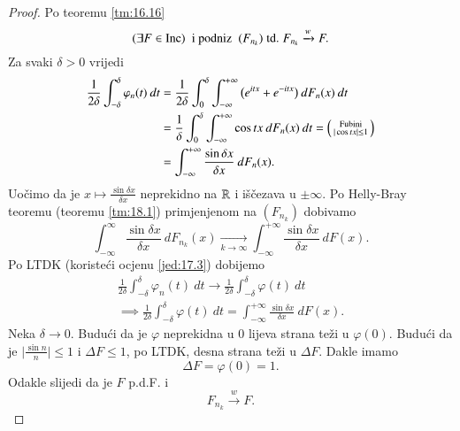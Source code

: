 \begin{proof}
    Po teoremu \ref{tm:16.16}
    \begin{equation*}
        (\exists F \in \mathrm{Inc}) \; \textnormal{ i podniz } \; (F_{n_k}) \; \mathrm{td.} \; F_{n_k} \xrightarrow{w} F.
    \end{equation*}
    Za svaki $\delta > 0$ vrijedi
    \begin{equation*}
        \begin{aligned}
            \frac{1}{2 \delta} \int_{-\delta}^\delta  \varphi_n (t) \: d t &= \frac{1}{2 \delta} \int_0^\delta \int_{-\infty}^{+\infty} \big( e^{itx} + e^{-itx} \big) \: d F_n (x) \: d t\\
            &= \frac{1}{\delta} \int_0^\delta \int_{-\infty}^{+\infty} \cos tx \: d F_n (x) \: dt =
            \begin{psmallmatrix}
                \textnormal{Fubini}\\
                |\cos tx| \leq 1
            \end{psmallmatrix}\\
            &= \int_{-\infty}^{+\infty} \frac{\sin \delta x}{\delta x} \: d F_n (x).
        \end{aligned}
    \end{equation*}
    Uo\v cimo da je $x \mapsto \frac{\sin \delta x}{\delta x}$ neprekidno na $\mathbb{R}$ i i\v s\v cezava u $\pm \infty$.
    Po Helly-Bray teoremu (teoremu \ref{tm:18.1}) primjenjenom na $(F_{n_k})$ dobivamo
    \begin{equation*}
        \int_{-\infty}^{\infty} \frac{\sin \delta x}{\delta x} \: d F_{n_k} (x) \xrightarrow[k \to \infty]{} \int_{-\infty}^{+\infty} \frac{\sin \delta x}{\delta x} \: d F (x).
    \end{equation*}
    Po LTDK (koriste\' ci ocjenu \eqref{jed:17.3}) dobijemo
    \begin{equation*}
        \begin{gathered}
            \frac{1}{2 \delta} \int_{-\delta}^\delta \varphi_n (t) \: d t \to \frac{1}{2 \delta} \int_{-\delta}^{\delta} \varphi (t) \: d t\\
            \implies \frac{1}{2 \delta} \int_{-\delta}^{\delta} \varphi (t) \: dt = \int_{-\infty}^{+\infty} \frac{\sin \delta x}{\delta x} \: d F (x).
        \end{gathered}
    \end{equation*}
    Neka $\delta \to 0$.
    Budu\' ci da je $\varphi$ neprekidna u $0$ lijeva strana te\v zi u $\varphi (0)$.
    Budu\' ci da je $\Big| \frac{\sin n}{n} \Big| \leq 1$ i $\Delta F \leq 1$, po LTDK, desna strana te\v zi u $\Delta F$.
    Dakle imamo
    \begin{equation*}
        \Delta F = \varphi (0) = 1.
    \end{equation*}
    Odakle slijedi da je $F$ p.d.F. i
    \begin{equation*}
        F_{n_k} \xrightarrow{w} F.
    \end{equation*}
    

\end{proof}
